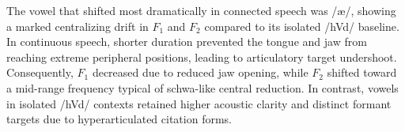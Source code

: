 \documentclass{article}
\begin{document}
The vowel that shifted most dramatically in connected speech was /\ae/, showing a marked centralizing drift in \(F_1\) and \(F_2\) compared to its isolated /hVd/ baseline. In continuous speech, shorter duration prevented the tongue and jaw from reaching extreme peripheral positions, leading to articulatory target undershoot. Consequently, \(F_1\) decreased due to reduced jaw opening, while \(F_2\) shifted toward a mid-range frequency typical of schwa-like central reduction. In contrast, vowels in isolated /hVd/ contexts retained higher acoustic clarity and distinct formant targets due to hyperarticulated citation forms.
\end{document}

